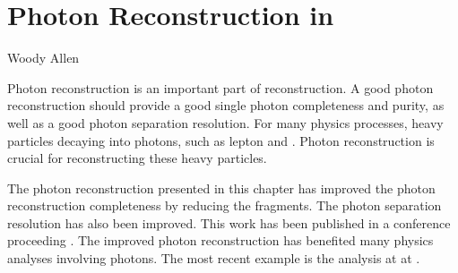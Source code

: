 \chapter{Photon Reconstruction in \pandora}
\label{chap:Photon}

%
{Woody Allen}


Photon reconstruction is an important part of \pandora reconstruction. A good photon reconstruction should provide a good single photon completeness and purity, as well as a good photon separation resolution. For many physics processes, heavy particles decaying into photons, such as \Ptau lepton and \Ppizero. Photon reconstruction is crucial for reconstructing these heavy particles.

The photon reconstruction presented in this chapter has improved the photon reconstruction completeness by reducing the fragments. The photon separation resolution has  also been improved. This work has been published in a conference proceeding \cite{Xu:2016rcz}. The improved  photon reconstruction has benefited many physics analyses involving photons. The most recent example is the  \HepProcess{\PHiggs \to \Pgamma \Pgamma} analysis at  at \CLIC \cite{Kacarevic:higgsToGammaGamma}.



